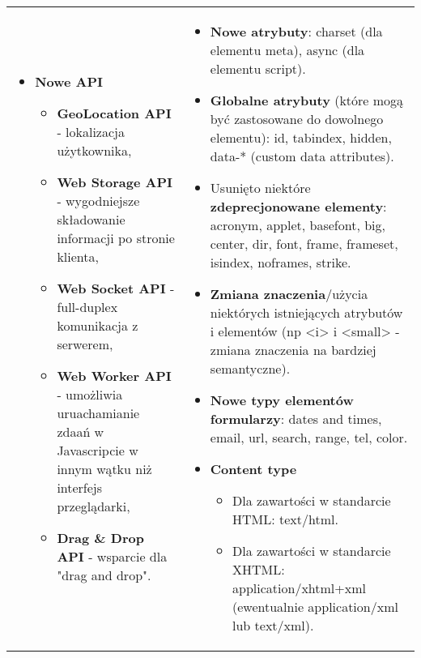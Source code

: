 \documentclass[../main.tex]{subfiles}
\begin{document}
\begin{table}[H]
\begin{center}
\begin{tabular}{p{8cm} p{8cm}}
\begin{itemize}
                    \item \textbf{Nowe API}
                    \begin{itemize}
                        \item \textbf{GeoLocation API} - lokalizacja użytkownika,
                        \item \textbf{Web Storage API} - wygodniejsze składowanie informacji po stronie klienta,
                        \item \textbf{Web Socket API} - full-duplex komunikacja z serwerem,
                        \item \textbf{Web Worker API} - umożliwia uruachamianie zdaań w Javascripcie w innym wątku niż interfejs przeglądarki,
                        \item \textbf{Drag \& Drop API} - wsparcie dla "drag and drop".
                    \end{itemize}
                \end{itemize}
                &
                \begin{itemize}
                    \item \textbf{Nowe atrybuty}: charset (dla elementu meta), async (dla elementu script).
                    \item \textbf{Globalne atrybuty} (które mogą być zastosowane do dowolnego elementu): id, tabindex, hidden, data-* (custom data attributes).
                    \item Usunięto niektóre \textbf{zdeprecjonowane elementy}: acronym, applet, basefont, big, center, dir, font, frame, frameset, isindex, noframes, strike.
                    \item \textbf{Zmiana znaczenia}/użycia niektórych istniejących atrybutów i elementów (np <i> i <small> - zmiana znaczenia na bardziej semantyczne).
                    \item \textbf{Nowe typy elementów formularzy}: dates and times, email, url, search, range, tel, color.
                    \item \textbf{Content type}
                    \begin{itemize}
                        \item Dla zawartości w standarcie HTML: text/html.
                        \item Dla zawartości w standarcie XHTML: application/xhtml+xml (ewentualnie application/xml lub text/xml).
                    \end{itemize}
                \end{itemize}
            \end{tabular}
        \end{center}
    \end{table}
\end{document}
